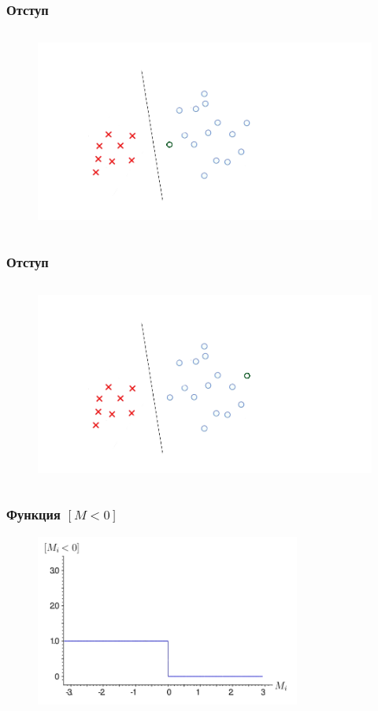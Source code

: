 \documentclass[12pt]{beamer}
\begin{document}
\begin{frame}\frametitle{Отступ}
\begin{figure}[htbp]
  \includegraphics[height=190pt, keepaspectratio = true]{images/margin1}   
\end{figure}
\end{frame}

\begin{frame}\frametitle{Отступ}
\begin{figure}[htbp]
  \includegraphics[height=190pt, keepaspectratio = true]{images/margin2}   
\end{figure}
\end{frame}


\begin{frame}\frametitle{Функция $[M<0]$}
\begin{figure}[htbp]
  \includegraphics[height=160pt, keepaspectratio = true]{images/l1}   
\end{figure}
\end{frame}
\end{document}
